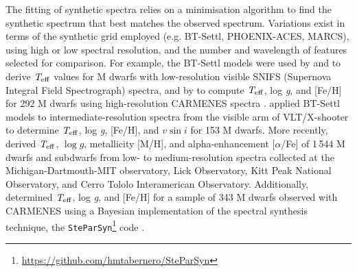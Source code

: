 The fitting of synthetic spectra relies on a minimisation algorithm to find the synthetic spectrum that best matches the observed spectrum. Variations exist in terms of the synthetic grid employed (e.g. BT-Settl, PHOENIX-ACES, MARCS), using high or low spectral resolution, and the number and wavelength of features selected for comparison.
For example, the BT-Settl models \citep{allard2012,Allard2013} were used by \citet{GaidosMann2014} and \citet{mann2015} to derive $\textit{T}_{\rm eff}$ values for M dwarfs with low-resolution visible SNIFS (Supernova Integral Field Spectrograph) spectra, and by \citet{Rajpurohit2018} to compute $\textit{T}_{\rm eff}$, log \textit{g}, and [Fe/H] for 292 M dwarfs using high-resolution CARMENES spectra \citep{reiners2018}. \citet{Kuznetsov2019} applied BT-Settl models to intermediate-resolution spectra from the visible arm of VLT/X-shooter \citep[intermediate resolution, high-efficiency spectrograph,][]{Vernet2011} to determine $\textit{T}_{\rm eff}$, log \textit{g}, [Fe/H], and $\textit{v}\sin{i}$ for 153 M dwarfs. More recently, \citet{Hejazi2020} derived $\textit{T}_{\rm eff}$, $\log{g}$,
metallicity [M/H], and alpha-enhancement [$\alpha$/Fe] of 1\,544 M dwarfs and subdwarfs from low- to medium-resolution spectra collected at the Michigan-Dartmouth-MIT observatory, Lick Observatory, Kitt Peak National Observatory, and Cerro Tololo Interamerican Observatory. Additionally,  determined $\textit{T}_{\rm eff}$, log \textit{g}, and [Fe/H] for a sample of 343 M dwarfs observed with CARMENES using a Bayesian implementation of the spectral synthesis technique, the \texttt{SteParSyn}\footnote{\url{https://github.com/hmtabernero/SteParSyn}} code \citep{Tabernero2022}.

